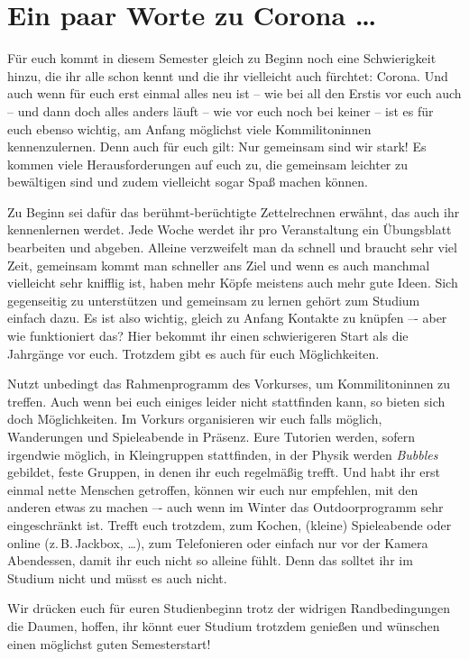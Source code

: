 \section{Ein paar Worte zu Corona \ldots}

Für euch kommt in diesem Semester gleich zu Beginn noch eine Schwierigkeit hinzu, die ihr alle schon kennt und die ihr vielleicht auch fürchtet: Corona.
Und auch wenn für euch erst einmal alles neu ist -- wie bei all den Erstis vor euch auch -- und dann doch alles anders läuft -- wie vor euch noch bei keiner -- ist es für euch ebenso wichtig, am Anfang möglichst viele Kommilitoninnen kennenzulernen. Denn auch für euch gilt: Nur gemeinsam sind wir stark! Es kommen viele Herausforderungen auf euch zu, die gemeinsam leichter zu bewältigen sind und zudem vielleicht sogar Spaß machen können.

Zu Beginn sei dafür das berühmt-berüchtigte Zettelrechnen erwähnt, das auch ihr kennenlernen werdet. Jede Woche werdet ihr pro Veranstaltung ein Übungsblatt bearbeiten und abgeben. Alleine verzweifelt man da schnell und braucht sehr viel Zeit, gemeinsam kommt man schneller ans Ziel und wenn es auch manchmal vielleicht sehr knifflig ist, haben mehr Köpfe meistens auch mehr gute Ideen. Sich gegenseitig zu unterstützen und gemeinsam zu lernen gehört zum Studium einfach dazu. Es ist also wichtig, gleich zu Anfang Kontakte zu knüpfen –- aber wie funktioniert das? Hier bekommt ihr einen schwierigeren Start als die Jahrgänge vor euch. Trotzdem gibt es auch für euch Möglichkeiten.

Nutzt unbedingt das Rahmenprogramm des Vorkurses, um Kommilitoninnen zu treffen. Auch wenn bei euch einiges leider nicht stattfinden kann, so bieten sich doch Möglichkeiten. Im Vorkurs organisieren wir euch falls möglich, Wanderungen und Spieleabende in Präsenz.
Eure Tutorien werden, sofern irgendwie möglich, in Kleingruppen stattfinden, in der Physik werden \emph{Bubbles} gebildet, feste Gruppen, in denen ihr euch regelmäßig trefft.
Und habt ihr erst einmal nette Menschen getroffen, können wir euch nur empfehlen, mit den anderen etwas zu machen –- auch wenn im Winter das Outdoorprogramm sehr eingeschränkt ist. Trefft euch trotzdem, zum Kochen, (kleine) Spieleabende oder online (z.\,B.\,Jackbox, \ldots), zum Telefonieren oder einfach nur vor der Kamera Abendessen, damit ihr euch nicht so alleine fühlt. Denn das solltet ihr im Studium nicht und müsst es auch nicht.

Wir drücken euch für euren Studienbeginn trotz der widrigen Randbedingungen die Daumen, hoffen, ihr könnt euer Studium trotzdem genießen und wünschen einen möglichst guten Semesterstart!
